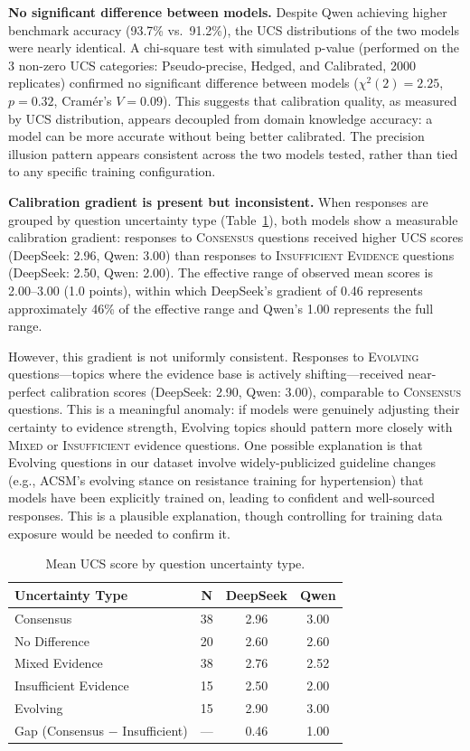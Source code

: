 \documentclass[manuscript, review, anonymous]{acmart}
\begin{document}
\textbf{No significant difference between models.} Despite Qwen achieving higher benchmark accuracy (93.7\% vs.\ 91.2\%), the UCS distributions of the two models were nearly identical. A chi-square test with simulated p-value (performed on the 3 non-zero UCS categories: Pseudo-precise, Hedged, and Calibrated, 2000 replicates) confirmed no significant difference between models ($\chi^2(2) = 2.25$, $p = 0.32$, Cram\'{e}r's $V = 0.09$). This suggests that calibration quality, as measured by UCS distribution, appears decoupled from domain knowledge accuracy: a model can be more accurate without being better calibrated. The precision illusion pattern appears consistent across the two models tested, rather than tied to any specific training configuration.

\textbf{Calibration gradient is present but inconsistent.} When responses are grouped by question uncertainty type (Table~\ref{tab:calibration_gradient}), both models show a measurable calibration gradient: responses to \textsc{Consensus} questions received higher UCS scores (DeepSeek: 2.96, Qwen: 3.00) than responses to \textsc{Insufficient Evidence} questions (DeepSeek: 2.50, Qwen: 2.00). The effective range of observed mean scores is 2.00--3.00 (1.0 points), within which DeepSeek's gradient of 0.46 represents approximately 46\% of the effective range and Qwen's 1.00 represents the full range.

However, this gradient is not uniformly consistent. Responses to \textsc{Evolving} questions---topics where the evidence base is actively shifting---received near-perfect calibration scores (DeepSeek: 2.90, Qwen: 3.00), comparable to \textsc{Consensus} questions. This is a meaningful anomaly: if models were genuinely adjusting their certainty to evidence strength, Evolving topics should pattern more closely with \textsc{Mixed} or \textsc{Insufficient} evidence questions. One possible explanation is that Evolving questions in our dataset involve widely-publicized guideline changes (e.g., ACSM's evolving stance on resistance training for hypertension) that models have been explicitly trained on, leading to confident and well-sourced responses. This is a plausible explanation, though controlling for training data exposure would be needed to confirm it.

\begin{table}[ht]
\centering
\caption{Mean UCS score by question uncertainty type.}
\label{tab:calibration_gradient}
\begin{tabular}{lccc}
\toprule
Uncertainty Type & N & DeepSeek & Qwen \\
\midrule
Consensus              & 38 & 2.96 & 3.00 \\
No Difference          & 20 & 2.60 & 2.60 \\
Mixed Evidence         & 38 & 2.76 & 2.52 \\
Insufficient Evidence  & 15 & 2.50 & 2.00 \\
Evolving               & 15 & 2.90 & 3.00 \\
\midrule
Gap (Consensus $-$ Insufficient) & --- & 0.46 & 1.00 \\
\bottomrule
\end{tabular}
\end{table}
\end{document}
